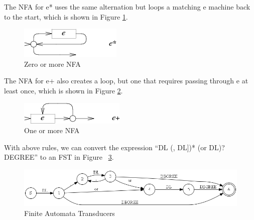 The NFA for e* uses the same alternation but loops a matching e machine back to the start, which is shown in Figure \ref{fig:nfa_star}.

\begin{figure}[htbp]
  \centering
  \includegraphics[scale=1]{images/star.png}
  \caption{Zero or more NFA}
  \label{fig:nfa_star}
\end{figure}

The NFA for e+ also creates a loop, but one that requires passing through e at least once, which is shown in Figure \ref{fig:nfa_plus}.

\begin{figure}[htbp]
  \centering
  \includegraphics[scale=1]{images/plus.png}
  \caption{One or more NFA}
  \label{fig:nfa_plus}
\end{figure}

With above rules, we can convert the expression ``DL (, DL])*  (or DL)? DEGREE'' to an FST in Figure ~\ref{fig:fst}.

\begin{figure}[htbp]
  \centering
  \includegraphics[scale=0.6]{images/test_tokenre2_6.png}
  \caption{Finite Automata Transducers}
  \label{fig:fst}
\end{figure}


